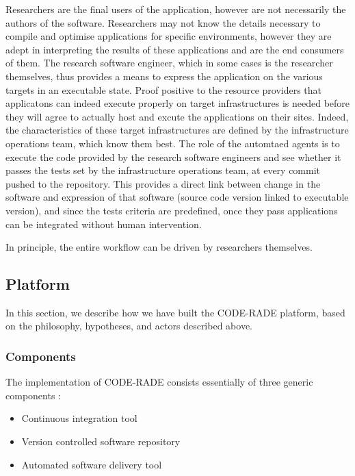 \documentclass[a4paper]{jpconf}
\begin{document}
	Researchers are the final users of the application, however are not necessarily the authors of the software. Researchers may not know the details necessary to compile and optimise applications for specific environments, however they are adept in interpreting the results of these applications and are the end consumers of them. The research software engineer, which in some cases is the researcher themselves, thus provides a means to express the application on the various targets in an executable state. Proof positive to the resource providers that applicatons can indeed execute properly on target infrastructures is needed before they will agree to actually host and excute the applications on their sites. Indeed, the characteristics of these target infrastructures are defined by the infrastructure operations team, which know them best. The role of the automtaed agents is to execute the code provided by the research software engineers and see whether it passes the tests set by the infrastructure operations team, at every commit pushed to the repository. This provides a direct link between change in the software and expression of that software (source code version linked to executable version), and since the tests criteria are predefined, once they pass applications can be integrated without human intervention.

	In principle, the entire workflow can be driven by researchers themselves.

	\subsection{Platform}

	In this section, we describe how we have built the CODE-RADE platform, based on the philosophy, hypotheses, and actors described above.

	\subsubsection{Components}

	The implementation of CODE-RADE consists essentially of three generic components :

	\begin{itemize}
		\item Continuous integration tool
		\item Version controlled software repository
		\item Automated software delivery tool
	\end{itemize}
\end{document}
